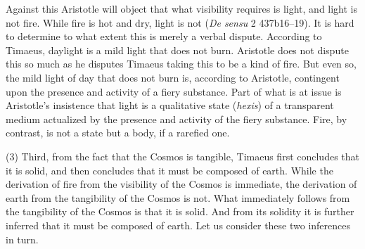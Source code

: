 Against this Aristotle will object that what visibility requires is light, and light is not fire. While fire is hot and dry, light is not (\emph{De sensu} 2 437b16--19). It is hard to determine to what extent this is merely a verbal dispute. According to Timaeus, daylight is a mild light that does not burn. Aristotle does not dispute this so much as he disputes Timaeus taking this to be a kind of fire. But even so, the mild light of day that does not burn is, according to Aristotle, contingent upon the presence and activity of a fiery substance. Part of what is at issue is Aristotle's insistence that light is a qualitative state (\emph{hexis}) of a transparent medium actualized by the presence and activity of the fiery substance. Fire, by contrast, is not a state but a body, if a rarefied one.

(3) Third, from the fact that the Cosmos is tangible, Timaeus first concludes that it is solid, and then concludes that it must be composed of earth. While the derivation of fire from the visibility of the Cosmos is immediate, the derivation of earth from the tangibility of the Cosmos is not. What immediately follows from the tangibility of the Cosmos is that it is solid. And from its solidity it is further inferred that it must be composed of earth. Let us consider these two inferences in turn. 

